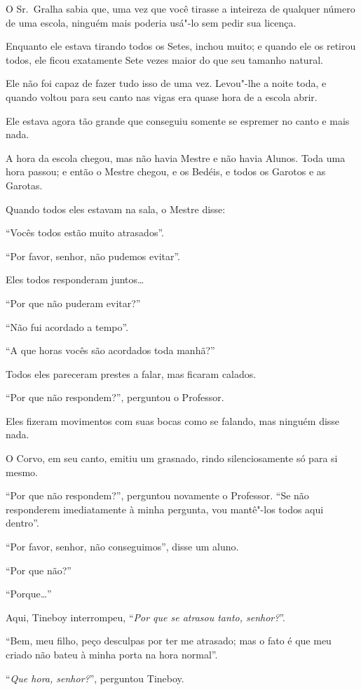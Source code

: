 O Sr.~Gralha sabia que, uma vez que você tirasse a inteireza de qualquer
número de uma escola, ninguém mais poderia usá"-lo sem pedir sua licença.

Enquanto ele estava tirando todos os Setes, inchou muito; e quando ele
os retirou todos, ele ficou exatamente Sete vezes maior do que seu
tamanho natural.

Ele não foi capaz de fazer tudo isso de uma vez. Levou"-lhe a noite toda,
e quando voltou para seu canto nas vigas era quase hora de a escola
abrir.

Ele estava agora tão grande que conseguiu somente se espremer no canto e
mais nada.

A hora da escola chegou, mas não havia Mestre e não havia Alunos. Toda
uma hora passou; e então o Mestre chegou, e os Bedéis, e todos os
Garotos e as Garotas.

Quando todos eles estavam na sala, o Mestre disse:

``Vocês todos estão muito atrasados''.

``Por favor, senhor, não pudemos evitar''.

Eles todos responderam juntos…

``Por que não puderam evitar?''

``Não fui acordado a tempo''.

``A que horas vocês são acordados toda manhã?''

Todos eles pareceram prestes a falar, mas ficaram calados.

``Por que não respondem?'', perguntou o Professor.

Eles fizeram movimentos com suas bocas como se falando, mas ninguém
disse nada.

O Corvo, em seu canto, emitiu um grasnado, rindo silenciosamente só para
si mesmo.

``Por que não respondem?'', perguntou novamente o Professor. ``Se não
responderem imediatamente à minha pergunta, vou mantê"-los todos aqui
dentro''.

``Por favor, senhor, não conseguimos'', disse um aluno.

``Por que não?''

``Porque…''

Aqui, Tineboy interrompeu, ``\emph{Por que se atrasou tanto, senhor?}''.

``Bem, meu filho, peço desculpas por ter me atrasado; mas o fato é que
meu criado não bateu à minha porta na hora normal''.

``\emph{Que hora, senhor?}'', perguntou Tineboy.

